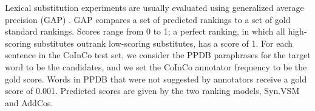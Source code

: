 \documentclass[11pt]{article}
\begin{document}

Lexical substitution experiments are usually evaluated using generalized average precision (GAP) \cite{kishida2005property}. GAP compares a set of predicted rankings to a set of gold standard rankings. Scores range from 0 to 1; a perfect ranking, in which all high-scoring substitutes outrank low-scoring substitutes, has a score of 1. For each sentence in the CoInCo test set, we consider the PPDB paraphrases for the target word to be the candidates, and we set the CoInCo annotator frequency to be the gold score. Words in PPDB that were not suggested by annotators receive a gold score of 0.001. Predicted scores are given by the two ranking models, Syn.VSM and AddCos.
\end{document}
